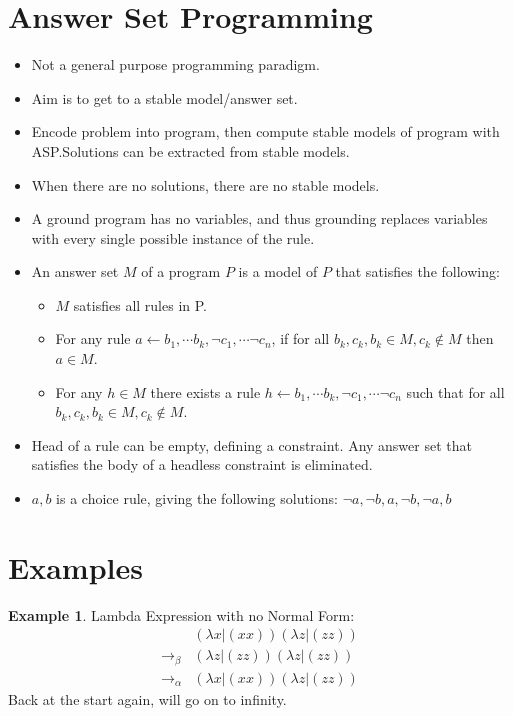 \documentclass[landscape, letterpaper]{extarticle}
\theoremstyle{definition}
\newtheorem{example}{Example}
\begin{document}
\begin{multicols}{3}
    \section*{Answer Set Programming}
    \begin{itemize}[noitemsep,nolistsep]
        \item Not a general purpose programming paradigm.
        \item Aim is to get to a stable model/answer set.
        \item Encode problem into program, then compute stable models of program with ASP.\@ Solutions can be extracted from stable models.
        \item When there are no solutions, there are no stable models.
        \item A ground program has no variables, and thus grounding replaces variables with every single possible instance of the rule.
        \item An answer set \(M\) of a program \(P\) is a model of \(P\) that satisfies the following:
        \begin{itemize}
            \item \(M\) satisfies all rules in P.
            \item For any rule \(a \leftarrow b_1, \cdots b_k, \neg c_1, \cdots \neg c_n\), if for all \(b_k, c_k, b_k \in M, c_k \notin M\) then \(a \in M\).
            \item For any \(h \in M\) there exists a rule \(h \leftarrow b_1, \cdots b_k, \neg c_1, \cdots \neg c_n\) such that for all \(b_k, c_k, b_k \in M, c_k \notin M\).
        \end{itemize}
        \item Head of a rule can be empty, defining a constraint. Any answer set that satisfies the body of a headless constraint is eliminated.
        \item \({a, b}\) is a choice rule, giving the following solutions: \({\neg a, \neg b}, {a, \neg b}, {\neg a, b}\)
    \end{itemize}
\pagebreak
    \section*{Examples}
    \begin{example}
        Lambda Expression with no Normal Form:
        \begin{align*}
                               & (\lambda x | (x x))(\lambda z | (z z)) \\
            \rightarrow_\beta  & (\lambda z | (z z))(\lambda z | (z z)) \\
            \rightarrow_\alpha & (\lambda x | (x x))(\lambda z | (z z))
        \end{align*}
        Back at the start again, will go on to infinity.
    \end{example}


\end{multicols}
\end{document}

